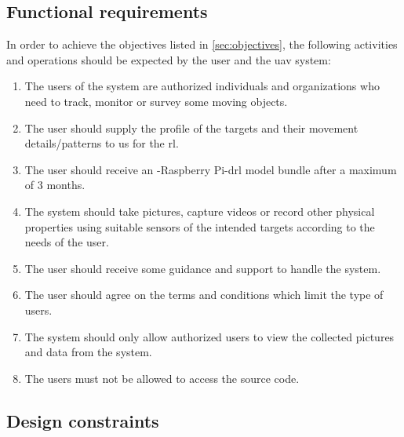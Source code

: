 \documentclass[../main.tex]{subfiles}
\begin{document}
\subsection{Functional requirements}

In order to achieve the objectives listed
in \cref{sec:objectives}, the following activities 
and operations should be expected by the user 
and the \gls{uav} system:

\begin{enumerate}
    \item The users of the system are authorized
        individuals and organizations who
        need to track, monitor or survey
        some moving objects.
    \item The user should supply the 
        profile of the targets 
        and their movement details/patterns
        to us for the \gls{rl}.
    \item The user should receive 
        an \anafi-Raspberry Pi-\gls{drl} 
        model bundle after a maximum of 3 months.
    \item The system should take pictures, capture videos
        or record other physical properties using
        suitable sensors of the intended
        targets according to the needs
        of the user.
    \item The user should receive some 
        guidance and support 
        to handle the system.
    \item The user should agree on 
        the terms and conditions 
        which limit the type of users.
    \item The system should only allow 
        authorized users 
        to view the collected pictures and 
        data from the \anafi system.
    \item The users must not be allowed to access 
        the source code.
\end{enumerate}

\subsection{Design constraints}
\end{document}
